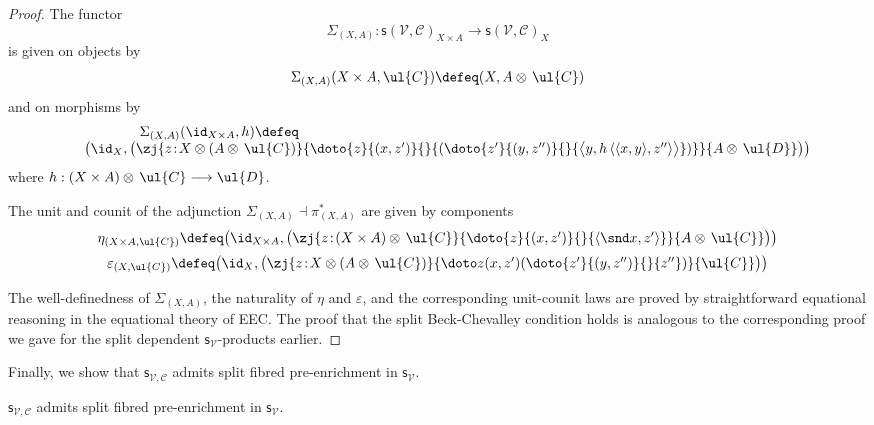 \begin{proof}
The functor 
\[
\Sigma_{(X,A)} : \mathsf{s}(\!\mathcal{V},\mathcal{C})_{X \times A} \longrightarrow \mathsf{s}(\!\mathcal{V},\mathcal{C})_X
\]
is given on objects by
\[
\begin{array}{c}
\Sigma_{(X,A)}(X \times A, \ul{C}) \defeq (X, A \otimes\, \ul{C})
\end{array}
\]
and on morphisms by
\[
\begin{array}{c}
\hspace{-11cm} \Sigma_{(X,A)}(\id_{X \times A},h) \defeq 
\\
\hspace{0.5cm} \big(\id_X, \big(\zj {z \!:\! X \otimes (A \otimes\, \ul{C})} {\doto {z} {(x,z')} {} {(\doto {z'} {(y,z'')} {} {\big\langle y , h\, \langle \langle x , y \rangle , z'' \rangle\big\rangle})}} {A \otimes\, \ul{D}}\big)\big)
\end{array}
\]
where $h : (X \times A) \otimes\, \ul{C} \longrightarrow \ul{D}$.

The unit and counit of the adjunction $\Sigma_{(X,A)} \dashv \pi^*_{(X,A)}$ are given by components
\[
\begin{array}{c}
\eta_{(X \times A , \ul{C})} \defeq \big(\id_{X \times A}, \big(\zj {z \!:\! (X \times A) \otimes\, \ul{C}} {\doto {z} {(x,z')} {} {\langle \snd x , z' \rangle}} {A \otimes\, \ul{C}}\big) \big)
\\[2mm]
\varepsilon_{(X,\ul{C})} \defeq \big(\id_X, \big(\zj {z \!:\! X \otimes (A \otimes\, \ul{C})} {\doto z {(x,z')} {} {(\doto {z'} {(y,z'')} {} {z''})}} {\ul{C}}\big)\big)
\end{array}
\vspace{0.15cm}
\]

The well-definedness of $\Sigma_{(X,A)}$, the naturality of $\eta$ and $\varepsilon$, and the corresponding unit-counit laws are proved by straightforward equational reasoning in the equational theory of EEC\raisebox{0.75pt}{+}. The proof that the split Beck-Chevalley condition holds is analogous to the corresponding proof we gave for the split dependent $\mathsf{s}_{\mathcal{V}}$-products earlier.
\end{proof}


Finally, we show that $\mathsf{s}_{\mathcal{V},\mathcal{C}}$ admits split fibred pre-enrichment in $\mathsf{s}_{\mathcal{V}}$.

\begin{proposition}
$\mathsf{s}_{\mathcal{V},\mathcal{C}}$ admits split fibred pre-enrichment in $\mathsf{s}_{\mathcal{V}}$.
\end{proposition}

